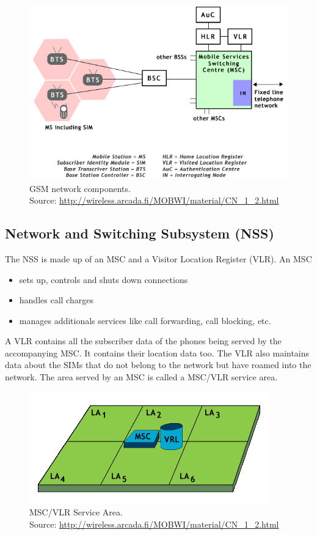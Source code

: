 \begin{figure}
\centering
\includegraphics[scale=0.7]{gsmNetworkComponents}
\caption[GSM network components]{GSM network components.\\
\footnotesize{Source: \url{http://wireless.arcada.fi/MOBWI/material/CN\_1\_2.html}}}
\end{figure}




\subsection{Network and Switching Subsystem (NSS)}

The NSS is made up of an MSC and a Visitor Location Register (VLR). An MSC 
\begin{itemize} 
\item sets up, controls and shuts down connections
\item handles call charges
\item manages additionals services like call forwarding, call blocking, etc.
\end{itemize}

A VLR contains all the subscriber data of the phones being served by the accompanying MSC. It contains their location data too. The VLR also maintains data about the SIMs that do not belong to the network but have roamed into the network. The area served by an MSC is called a MSC/VLR service area.

\begin{figure}
\centering
\includegraphics[scale=0.7]{mscvlrServiceArea}
\caption[MSC/VLR Service Area]{MSC/VLR Service Area.\\
\footnotesize{Source: \url{http://wireless.arcada.fi/MOBWI/material/CN\_1\_2.html}}}
\end{figure}

